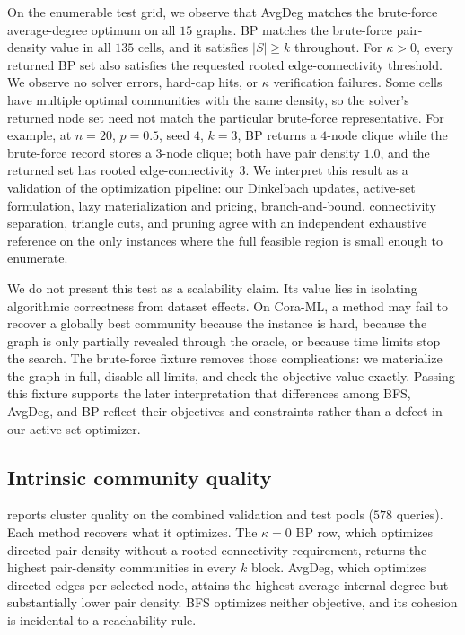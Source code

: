 \documentclass[12pt]{article}
\begin{document}
On the enumerable test grid, we observe that AvgDeg matches the brute-force average-degree optimum on all $15$ graphs.  BP matches the brute-force pair-density value in all $135$ cells, and it satisfies $|S|\ge k$ throughout.  For $\kappa>0$, every returned BP set also satisfies the requested rooted edge-connectivity threshold.  We observe no solver errors, hard-cap hits, or $\kappa$ verification failures.  Some cells have multiple optimal communities with the same density, so the solver's returned node set need not match the particular brute-force representative.  For example, at $n=20$, $p=0.5$, seed $4$, $k=3$, BP returns a $4$-node clique while the brute-force record stores a $3$-node clique; both have pair density $1.0$, and the returned set has rooted edge-connectivity $3$.  We interpret this result as a validation of the optimization pipeline: our Dinkelbach updates, active-set formulation, lazy materialization and pricing, branch-and-bound, connectivity separation, triangle cuts, and pruning agree with an independent exhaustive reference on the only instances where the full feasible region is small enough to enumerate.

We do not present this test as a scalability claim.  Its value lies in isolating algorithmic correctness from dataset effects.  On Cora-ML, a method may fail to recover a globally best community because the instance is hard, because the graph is only partially revealed through the oracle, or because time limits stop the search.  The brute-force fixture removes those complications: we materialize the graph in full, disable all limits, and check the objective value exactly.  Passing this fixture supports the later interpretation that differences among BFS, AvgDeg, and BP reflect their objectives and constraints rather than a defect in our active-set optimizer.

\subsection{Intrinsic community quality}
\label{subsec:intrinsic-results}

 reports cluster quality on the combined validation and test pools ($578$ queries).  Each method recovers what it optimizes.  The $\kappa=0$ BP row, which optimizes directed pair density without a rooted-connectivity requirement, returns the highest pair-density communities in every $k$ block.  AvgDeg, which optimizes directed edges per selected node, attains the highest average internal degree but substantially lower pair density.  BFS optimizes neither objective, and its cohesion is incidental to a reachability rule.
\end{document}
